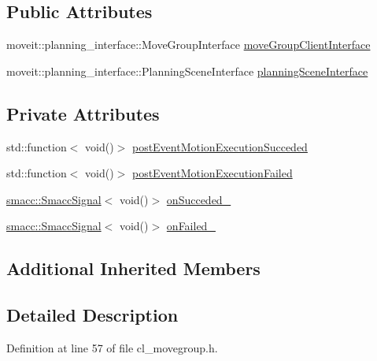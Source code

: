 \subsection*{Public Attributes}
\begin{DoxyCompactItemize}
\item 
moveit\+::planning\+\_\+interface\+::\+Move\+Group\+Interface \hyperlink{classsm__moveit_1_1cl__movegroup_1_1ClMoveGroup_a23acf6883455566dbab30e4367c2144d}{move\+Group\+Client\+Interface}
\item 
moveit\+::planning\+\_\+interface\+::\+Planning\+Scene\+Interface \hyperlink{classsm__moveit_1_1cl__movegroup_1_1ClMoveGroup_a26b5c9e0aef1cd67ee977a756b69cf76}{planning\+Scene\+Interface}
\end{DoxyCompactItemize}
\subsection*{Private Attributes}
\begin{DoxyCompactItemize}
\item 
std\+::function$<$ void()$>$ \hyperlink{classsm__moveit_1_1cl__movegroup_1_1ClMoveGroup_a1fde35aad5c4d3c0461d4b75553e6862}{post\+Event\+Motion\+Execution\+Succeded}
\item 
std\+::function$<$ void()$>$ \hyperlink{classsm__moveit_1_1cl__movegroup_1_1ClMoveGroup_a742a3504755ab7bae290c87290d2bf3f}{post\+Event\+Motion\+Execution\+Failed}
\item 
\hyperlink{classsmacc_1_1SmaccSignal}{smacc\+::\+Smacc\+Signal}$<$ void()$>$ \hyperlink{classsm__moveit_1_1cl__movegroup_1_1ClMoveGroup_ad0a02fb564967bae0808c966dd1e3c36}{on\+Succeded\+\_\+}
\item 
\hyperlink{classsmacc_1_1SmaccSignal}{smacc\+::\+Smacc\+Signal}$<$ void()$>$ \hyperlink{classsm__moveit_1_1cl__movegroup_1_1ClMoveGroup_ab4d03a5e64608a13458d740ce1536c8e}{on\+Failed\+\_\+}
\end{DoxyCompactItemize}
\subsection*{Additional Inherited Members}


\subsection{Detailed Description}


Definition at line 57 of file cl\+\_\+movegroup.\+h.



